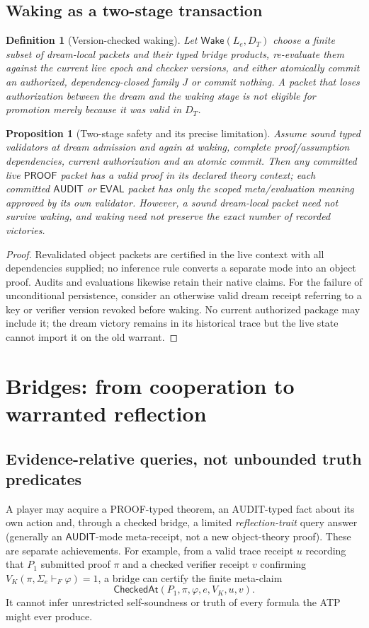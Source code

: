 \documentclass[11pt,letterpaper]{article}
\newtheorem{proposition}[theorem]{Proposition}
\newtheorem{definition}[theorem]{Definition}
\newcommand{\Pk}{\mathsf{PROOF}}
\newcommand{\Au}{\mathsf{AUDIT}}
\newcommand{\Ev}{\mathsf{EVAL}}
\newcommand{\Sigmae}{\Sigma_e}
\begin{document}
\subsection{Waking as a two-stage transaction}
\begin{definition}[Version-checked waking]
Let $\mathsf{Wake}(L_e,D_T)$ choose a finite subset of dream-local packets and their typed bridge products, re-evaluate them against the \emph{current} live epoch and checker versions, and either atomically commit an authorized, dependency-closed family $J$ or commit nothing. A packet that loses authorization between the dream and the waking stage is not eligible for promotion merely because it was valid in $D_T$.
\end{definition}
\begin{proposition}[Two-stage safety and its precise limitation]\label{prop:wakesafe}
Assume sound typed validators at dream admission and again at waking, complete proof/assumption dependencies, current authorization and an atomic commit. Then any committed live $\Pk$ packet has a valid proof in its declared theory context; each committed $\Au$ or $\Ev$ packet has only the scoped meta/evaluation meaning approved by its own validator. However, a sound dream-local packet need not survive waking, and \emph{waking need not preserve the exact number of recorded victories}.
\end{proposition}
\begin{proof}
Revalidated object packets are certified in the live context with all dependencies supplied; no inference rule converts a separate mode into an object proof. Audits and evaluations likewise retain their native claims. For the failure of unconditional persistence, consider an otherwise valid dream receipt referring to a key or verifier version revoked before waking. No current authorized package may include it; the dream victory remains in its historical trace but the live state cannot import it on the old warrant.
\end{proof}

\section{Bridges: from cooperation to warranted reflection}\label{gl-first-W1-s6}
\subsection{Evidence-relative queries, not unbounded truth predicates}
A player may acquire a PROOF-typed theorem, an AUDIT-typed fact about its own action and, through a checked bridge, a limited \emph{reflection-trait} query answer (generally an $\Au$-mode meta-receipt, not a new object-theory proof). These are separate achievements. For example, from a valid trace receipt $u$ recording that $P_1$ submitted proof $\pi$ and a checked verifier receipt $v$ confirming $V_K(\pi,\Sigmae\vdash_F\varphi)=1$, a bridge can certify the finite meta-claim
\[
\mathsf{CheckedAt}(P_1,\pi,\varphi,e,V_K,u,v).
\]
It cannot infer unrestricted self-soundness or truth of every formula the ATP might ever produce.
\end{document}

